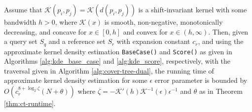 \begin{thm}
Assume that $\mathcal{K}(p_i, p_j) = \mathcal{K}\left(d(p_i, p_j)\right)$ is a
shift-invariant kernel with some bandwidth $h > 0$, where $\mathcal{K}(x)$ is
smooth, non-negative, monotonically decreasing, and concave for $x \in [0, h]$
and convex for $x \in (h, \infty)$. Then, given a query set $S_q$ and a
reference set $S_r$ with
expansion constant $c_r$, and using the
approximate kernel density estimation \texttt{BaseCase()} and \texttt{Score()}
as given in Algorithms \ref{alg:kde_base_case} and \ref{alg:kde_score},
respectively, with the traversal given in Algorithm \ref{alg:cover-tree-dual},
the running time of approximate kernel density estimation for some $\epsilon$
error parameter is bounded by
$O(c_r^{8 + \log_2 \zeta} (N + \theta))$
where $\zeta = -\mathcal{K}'(h) \mathcal{K}^{-1}(\epsilon) \epsilon^{-1}$ and
$\theta$ as in Theorem \ref{thm:ct-runtime}.

\label{thm:kde-bound}
\end{thm}

